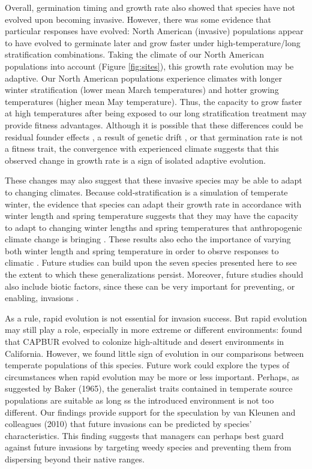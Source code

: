 \documentclass[12pt]{article}\usepackage[]{graphicx}\usepackage[]{color}
\begin{document}
	Overall, germination timing and growth rate also showed that species have not evolved upon becoming invasive. However, there was some evidence that particular responses have evolved: North American (invasive) populations appear to have evolved to germinate later and grow faster under high-temperature/long stratification combinations. Taking the climate of our North American populations into account (Figure \ref{fig:sites}), this growth rate evolution may be adaptive. Our North American populations experience climates with longer winter stratification  (lower mean March temperatures) and hotter growing temperatures (higher mean May temperature). Thus, the capacity to grow faster at high temperatures after being exposed to our long stratification treatment may provide fitness advantages. Although it is  possible that these differences could be residual founder effects \parencite{Shirk2014}, a result of genetic drift \parencite{Eckert1996}, or that germination rate is not a fitness trait,  the convergence with experienced climate suggests that this observed change in growth rate is a sign of isolated adaptive evolution. 
	
	These changes may also suggest that these invasive species may be able to adapt to changing climates. Because cold-stratification is a simulation of temperate winter, the evidence that species can adapt their growth rate in accordance with winter length and spring temperature suggests that they may have the capacity to adapt to changing winter lengths and spring temperatures that anthropogenic climate change is bringing \parencite{IPCC2015}. These results also echo the  importance of varying both winter length and spring temperature in order to obsrve responses to climatic \parencite[e.g.,][]{Bernareggi2016}. Future studies can build upon the seven species presented here to see the extent to which these generalizations persist. Moreover, future studies should also include biotic factors, since these can be very important for preventing, or enabling, invasions \parencite{Germain2018}. 
	
As a rule, rapid evolution is not essential for invasion success. But rapid evolution may still play a role, especially in more extreme or different environments:  \textcite{Linde2001} found that CAPBUR evolved to colonize high-altitude and desert environments in California. However, we found little sign of evolution in our comparisons between temperate populations of this species. Future work could explore the types of circumstances when rapid evolution may be more or less important. Perhaps, as suggested by Baker (1965), the generalist traits contained in temperate source populations are suitable as long ss the introduced environment is not too different. Our findings provide support for  the speculation by van Kleunen and colleagues (2010) that future invasions can be predicted by species' characteristics. This finding suggests that managers can perhaps best guard against future invasions by targeting weedy species and preventing them from dispersing beyond their native ranges. 
	
\end{document}
